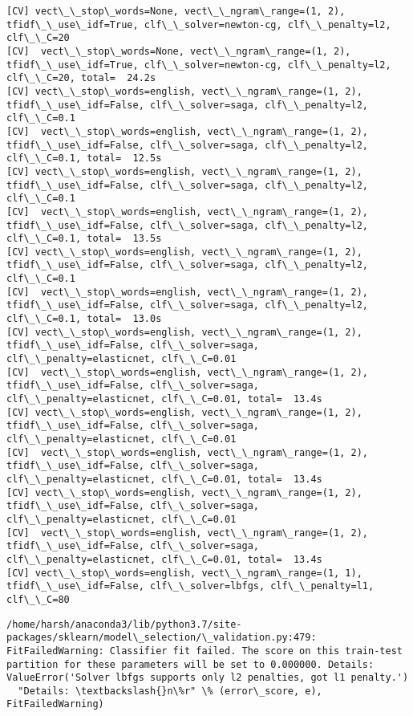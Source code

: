 \documentclass[11pt]{article}
\begin{document}
\begin{Verbatim}[commandchars=\\\{\}]
[CV] vect\_\_stop\_words=None, vect\_\_ngram\_range=(1, 2), tfidf\_\_use\_idf=True, clf\_\_solver=newton-cg, clf\_\_penalty=l2, clf\_\_C=20 
[CV]  vect\_\_stop\_words=None, vect\_\_ngram\_range=(1, 2), tfidf\_\_use\_idf=True, clf\_\_solver=newton-cg, clf\_\_penalty=l2, clf\_\_C=20, total=  24.2s
[CV] vect\_\_stop\_words=english, vect\_\_ngram\_range=(1, 2), tfidf\_\_use\_idf=False, clf\_\_solver=saga, clf\_\_penalty=l2, clf\_\_C=0.1 
[CV]  vect\_\_stop\_words=english, vect\_\_ngram\_range=(1, 2), tfidf\_\_use\_idf=False, clf\_\_solver=saga, clf\_\_penalty=l2, clf\_\_C=0.1, total=  12.5s
[CV] vect\_\_stop\_words=english, vect\_\_ngram\_range=(1, 2), tfidf\_\_use\_idf=False, clf\_\_solver=saga, clf\_\_penalty=l2, clf\_\_C=0.1 
[CV]  vect\_\_stop\_words=english, vect\_\_ngram\_range=(1, 2), tfidf\_\_use\_idf=False, clf\_\_solver=saga, clf\_\_penalty=l2, clf\_\_C=0.1, total=  13.5s
[CV] vect\_\_stop\_words=english, vect\_\_ngram\_range=(1, 2), tfidf\_\_use\_idf=False, clf\_\_solver=saga, clf\_\_penalty=l2, clf\_\_C=0.1 
[CV]  vect\_\_stop\_words=english, vect\_\_ngram\_range=(1, 2), tfidf\_\_use\_idf=False, clf\_\_solver=saga, clf\_\_penalty=l2, clf\_\_C=0.1, total=  13.0s
[CV] vect\_\_stop\_words=english, vect\_\_ngram\_range=(1, 2), tfidf\_\_use\_idf=False, clf\_\_solver=saga, clf\_\_penalty=elasticnet, clf\_\_C=0.01 
[CV]  vect\_\_stop\_words=english, vect\_\_ngram\_range=(1, 2), tfidf\_\_use\_idf=False, clf\_\_solver=saga, clf\_\_penalty=elasticnet, clf\_\_C=0.01, total=  13.4s
[CV] vect\_\_stop\_words=english, vect\_\_ngram\_range=(1, 2), tfidf\_\_use\_idf=False, clf\_\_solver=saga, clf\_\_penalty=elasticnet, clf\_\_C=0.01 
[CV]  vect\_\_stop\_words=english, vect\_\_ngram\_range=(1, 2), tfidf\_\_use\_idf=False, clf\_\_solver=saga, clf\_\_penalty=elasticnet, clf\_\_C=0.01, total=  13.4s
[CV] vect\_\_stop\_words=english, vect\_\_ngram\_range=(1, 2), tfidf\_\_use\_idf=False, clf\_\_solver=saga, clf\_\_penalty=elasticnet, clf\_\_C=0.01 
[CV]  vect\_\_stop\_words=english, vect\_\_ngram\_range=(1, 2), tfidf\_\_use\_idf=False, clf\_\_solver=saga, clf\_\_penalty=elasticnet, clf\_\_C=0.01, total=  13.4s
[CV] vect\_\_stop\_words=english, vect\_\_ngram\_range=(1, 1), tfidf\_\_use\_idf=False, clf\_\_solver=lbfgs, clf\_\_penalty=l1, clf\_\_C=80 

    \end{Verbatim}

    \begin{Verbatim}[commandchars=\\\{\}]
/home/harsh/anaconda3/lib/python3.7/site-packages/sklearn/model\_selection/\_validation.py:479: FitFailedWarning: Classifier fit failed. The score on this train-test partition for these parameters will be set to 0.000000. Details: 
ValueError('Solver lbfgs supports only l2 penalties, got l1 penalty.')
  "Details: \textbackslash{}n\%r" \% (error\_score, e), FitFailedWarning)

    \end{Verbatim}
\end{document}
